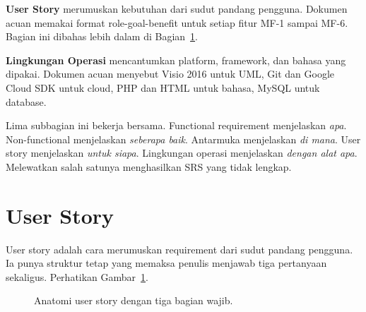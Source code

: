 \documentclass[11pt,a4paper]{article}
\begin{document}
\textbf{User Story} merumuskan kebutuhan dari sudut pandang pengguna. Dokumen acuan memakai format role-goal-benefit untuk setiap fitur MF-1 sampai MF-6. Bagian ini dibahas lebih dalam di Bagian~\ref{sec:user-story}.

\textbf{Lingkungan Operasi} mencantumkan platform, framework, dan bahasa yang dipakai. Dokumen acuan menyebut Visio 2016 untuk UML, Git dan Google Cloud SDK untuk cloud, PHP dan HTML untuk bahasa, MySQL untuk database.

Lima subbagian ini bekerja bersama. Functional requirement menjelaskan \textit{apa}. Non-functional menjelaskan \textit{seberapa baik}. Antarmuka menjelaskan \textit{di mana}. User story menjelaskan \textit{untuk siapa}. Lingkungan operasi menjelaskan \textit{dengan alat apa}. Melewatkan salah satunya menghasilkan SRS yang tidak lengkap.

\section{User Story}

\label{sec:user-story}

User story adalah cara merumuskan requirement dari sudut pandang pengguna. Ia punya struktur tetap yang memaksa penulis menjawab tiga pertanyaan sekaligus. Perhatikan Gambar~\ref{fig:user-story}.

\begin{figure}[H]
	\centering
	\caption{Anatomi user story dengan tiga bagian wajib.}
	\label{fig:user-story}
\end{figure}
\end{document}

